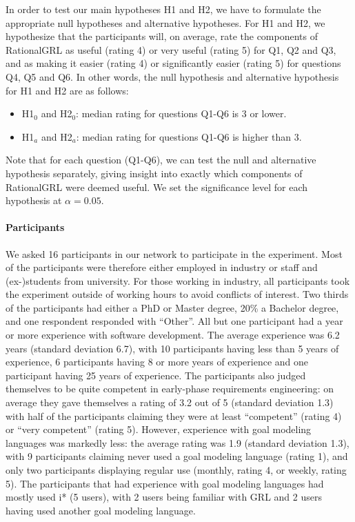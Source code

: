 In order to test our main hypotheses H1 and H2, we have to formulate the appropriate null hypotheses and alternative hypotheses. For H1 and H2, we hypothesize that the participants will, on average, rate the components of RationalGRL as useful (rating 4) or very useful (rating 5) for Q1, Q2 and Q3, and as making it easier (rating 4) or significantly easier (rating 5) for questions Q4, Q5 and Q6. In other words, the null hypothesis and alternative hypothesis for H1 and H2 are as follows:
\begin{itemize}
\item H1$_{0}$ and H2$_{0}$: median rating for questions Q1-Q6 is 3 or lower.
\item H1$_{a}$ and H2$_{a}$: median rating for questions Q1-Q6 is higher than 3.
\end{itemize}
Note that for each question (Q1-Q6), we can test the null and alternative hypothesis separately, giving insight into exactly which components of RationalGRL were deemed useful. We set the significance level for each hypothesis at $\alpha = 0.05$.

\paragraph{Participants}
We asked 16 participants in our network to participate in the experiment. Most of the participants were therefore either employed in industry or staff and (ex-)students from university. For those working in industry, all participants took the experiment outside of working hours to avoid conflicts of interest. Two thirds of the participants had either a PhD or Master degree, 20\% a Bachelor degree, and one respondent responded with ``Other''. All but one participant had a year or more experience with software development. The average experience was 6.2 years (standard deviation 6.7), with 10 participants having less than 5 years of experience, 6 participants having 8 or more years of experience and one participant having 25 years of experience. The participants also judged themselves to be quite competent in  early-phase requirements engineering: on average they gave themselves a rating of 3.2 out of 5 (standard deviation 1.3) with half of the participants claiming they were at least ``competent'' (rating 4) or ``very competent'' (rating 5). However, experience with goal modeling languages was markedly less: the average rating was 1.9 (standard deviation 1.3), with 9 participants claiming never used a goal modeling language (rating 1), and only two participants displaying regular use (monthly, rating 4, or weekly, rating 5). The participants that had experience with goal modeling languages had mostly used i* (5 users), with 2 users being familiar with GRL and 2 users having used another goal modeling language.

